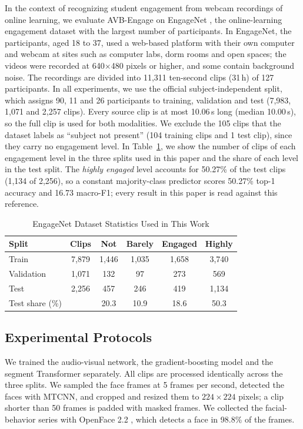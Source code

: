 \documentclass[journal]{IEEEtran}
\newcommand{\ournet}{AVB-Engage}
\begin{document}
In the context of recognizing student engagement from webcam recordings of online learning, we evaluate \ournet{} on EngageNet \cite{singh2023engagenet}, the online-learning engagement dataset with the largest number of participants. In EngageNet, the participants, aged 18 to 37, used a web-based platform with their own computer and webcam at sites such as computer labs, dorm rooms and open spaces; the videos were recorded at 640$\times$480 pixels or higher, and some contain background noise. The recordings are divided into 11,311 ten-second clips (31\,h) of 127 participants. In all experiments, we use the official subject-independent split, which assigns 90, 11 and 26 participants to training, validation and test (7,983, 1,071 and 2,257 clips). Every source clip is at most 10.06\,s long (median 10.00\,s), so the full clip is used for both modalities. We exclude the 105 clips that the dataset labels as ``subject not present'' (104 training clips and 1 test clip), since they carry no engagement level. In Table~\ref{tab_dataset}, we show the number of clips of each engagement level in the three splits used in this paper and the share of each level in the test split. The \emph{highly engaged} level accounts for 50.27\% of the test clips (1,134 of 2,256), so a constant majority-class predictor scores 50.27\% top-1 accuracy and 16.73 macro-F1; every result in this paper is read against this reference.

\begin{table}[!t]
\setlength{\tabcolsep}{3pt}
\renewcommand{\arraystretch}{1.2}
\caption{EngageNet Dataset Statistics Used in This Work}
\label{tab_dataset}
\centering
\begin{tabular}{lccccc}
\hline
Split & Clips & Not & Barely & Engaged & Highly\\
\hline
Train & 7,879 & 1,446 & 1,035 & 1,658 & 3,740\\
Validation & 1,071 & 132 & 97 & 273 & 569\\
Test & 2,256 & 457 & 246 & 419 & 1,134\\
\hline
Test share (\%) & & 20.3 & 10.9 & 18.6 & 50.3\\
\hline
\end{tabular}
\end{table}

\subsection{Experimental Protocols}

We trained the audio-visual network, the gradient-boosting model and the segment Transformer separately. All clips are processed identically across the three splits. We sampled the face frames at 5 frames per second, detected the faces with MTCNN, and cropped and resized them to $224 \times 224$ pixels; a clip shorter than 50 frames is padded with masked frames. We collected the facial-behavior series with OpenFace 2.2 \cite{baltrusaitis2018openface}, which detects a face in 98.8\% of the frames.
\end{document}
